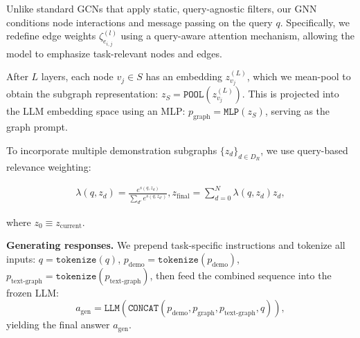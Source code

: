 Unlike standard GCNs that apply static, query-agnostic filters, our GNN conditions node interactions and message passing on the query \( q \). Specifically, we redefine edge weights \( \zeta_{e_{i,j}}^{(l)} \) using a query-aware attention mechanism, allowing the model to emphasize task-relevant nodes and edges.

After \( L \) layers, each node \( v_j \in S \) has an embedding \( z_{v_j}^{(L)} \), which we mean-pool to obtain the subgraph representation:
$z_S = \texttt{POOL}(z_{v_j}^{(L)})$.
This is projected into the LLM embedding space using an MLP:
$p_\text{graph} = \texttt{MLP}(z_S)$,
serving as the graph prompt.

To incorporate multiple demonstration subgraphs \( \{z_d\}_{d \in D_R} \), we 
use query-based relevance weighting:

{\small
\begin{align}
\lambda(q, z_d) = \frac{e^{s(q, z_d)}}{\sum_{d'} e^{s(q, z_{d'})}}, 
z_{\text{final}} = \sum_{d=0}^N \lambda(q, z_d) z_d,
\end{align}
}

where \( z_0 \equiv z_{\text{current}} \).

\textbf{Generating responses.} We prepend task-specific instructions and tokenize all inputs:
$q = \texttt{tokenize}(q)$, $p_\text{demo} = \texttt{tokenize}(p_\text{demo})$, $p_\text{text-graph} = \texttt{tokenize}(p_\text{text-graph})$,
then feed the combined sequence into the frozen LLM:
\begin{equation}
a_\text{gen} = \texttt{LLM}(\texttt{CONCAT}(p_\text{demo}, p_\text{graph}, p_\text{text-graph}, q)),
\end{equation}
yielding the final answer \( a_\text{gen} \).

